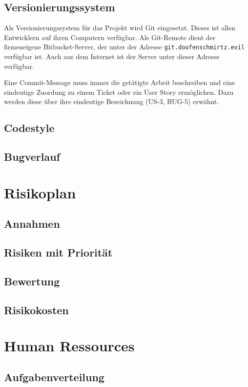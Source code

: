 \subsection{Versionierungssystem}

Als Versionierungssystem für das Projekt wird Git eingesetzt. Dieses ist allen Entwicklern auf ihren Computern verfügbar. Als Git-Remote dient der firmeneigene Bitbucket-Server, der unter der Adresse \texttt{git.doofenschmirtz.evil} verfügbar ist. Auch aus dem Internet ist der Server unter dieser Adresse verfügbar.

Eine Commit-Message muss immer die getätigte Arbeit beschreiben und eine eindeutige Zuordung zu einem Ticket oder ein User Story ermöglichen. Dazu werden diese über ihre eindeutige Bezeichnung (US-3, BUG-5) erwähnt.

\subsection{Codestyle} %
\lipsum[2]
\subsection{Bugverlauf}
\lipsum[2]
\section{Risikoplan}
\lipsum[2]
\subsection{Annahmen} %
\lipsum[2]
\subsection{Risiken mit Priorität} %
\lipsum[2]
\subsection{Bewertung } %
\lipsum[2]
\subsection{Risikokosten}
\lipsum[2]
\section{Human Ressources}
\lipsum[2]
\subsection{Aufgabenverteilung}
\lipsum[2]
